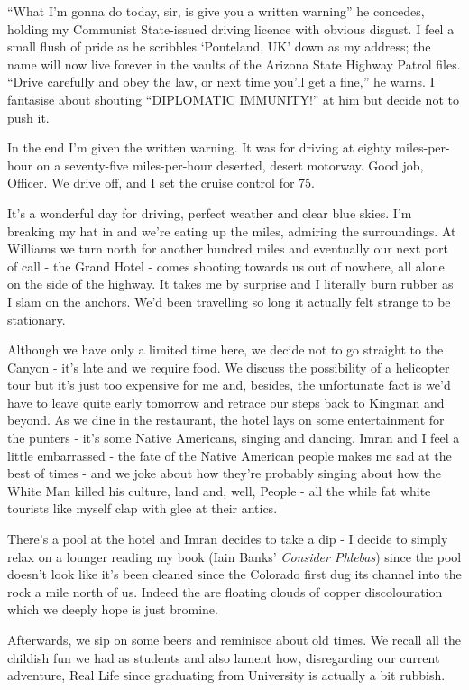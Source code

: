 \documentclass[a5paper,titlepage,11pt,draft]{book}
\begin{document}
``What I'm gonna do today, sir, is give you a written warning'' he concedes, holding my Communist State-issued driving licence with obvious disgust.  I feel a small flush of pride as he scribbles `Ponteland, UK' down as my address; the name will now live forever in the vaults of the Arizona State Highway Patrol files.  ``Drive carefully and obey the law, or next time you'll get a fine,'' he warns.  I fantasise about shouting ``DIPLOMATIC IMMUNITY!'' at him but decide not to push it.

In the end I'm given the written warning.  It was for driving at eighty miles-per-hour on a seventy-five miles-per-hour deserted, desert motorway.  Good job, Officer.  We drive off, and I set the cruise control for 75.

It's a wonderful day for driving, perfect weather and clear blue skies.  I'm breaking my hat in and we're eating up the miles, admiring the surroundings.  At Williams we turn north for another hundred miles and eventually our next port of call - the Grand Hotel - comes shooting towards us out of nowhere, all alone on the side of the highway.  It takes me by surprise and I literally burn rubber as I slam on the anchors.  We'd been travelling so long it actually felt strange to be stationary.

Although we have only a limited time here, we decide not to go straight to the Canyon - it's late and we require food.  We discuss the possibility of a helicopter tour but it's just too expensive for me and, besides, the unfortunate fact is we'd have to leave quite early tomorrow and retrace our steps back to Kingman and beyond.  As we dine in the restaurant, the hotel lays on some entertainment for the punters - it's some Native Americans, singing and dancing.  Imran and I feel a little embarrassed - the fate of the Native American people makes me sad at the best of times - and we joke about how they're probably singing about how the White Man killed his culture, land and, well, People - all the while fat white tourists like myself clap with glee at their antics.

There's a pool at the hotel and Imran decides to take a dip - I decide to simply relax on a lounger reading my book (Iain Banks' \emph{Consider Phlebas}) since the pool doesn't look like it's been cleaned since the Colorado first dug its channel into the rock a mile north of us.  Indeed the are floating clouds of copper discolouration which we deeply hope is just bromine.

Afterwards, we sip on some beers and reminisce about old times.  We recall all the childish fun we had as students and also lament how, disregarding our current adventure, Real Life since graduating from University is actually a bit rubbish.
\end{document}
